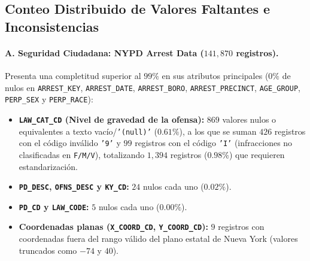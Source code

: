 \documentclass[11pt,a4paper]{article}
\begin{document}
\subsection{Conteo Distribuido de Valores Faltantes e Inconsistencias}
\label{subsec:conteo_faltantes}

\paragraph{A. Seguridad Ciudadana: NYPD Arrest Data ($141,870$ registros).}
Presenta una completitud superior al $99\%$ en sus atributos principales ($0\%$ de nulos en \texttt{ARREST\_KEY}, \texttt{ARREST\_DATE}, \texttt{ARREST\_BORO}, \texttt{ARREST\_PRECINCT}, \texttt{AGE\_GROUP}, \texttt{PERP\_SEX} y \texttt{PERP\_RACE}):
\begin{itemize}
    \item \textbf{\texttt{LAW\_CAT\_CD} (Nivel de gravedad de la ofensa):} $869$ valores nulos o equivalentes a texto vacío/\texttt{'(null)'} ($0.61\%$), a los que se suman $426$ registros con el código inválido \texttt{'9'} y $99$ registros con el código \texttt{'I'} (infracciones no clasificadas en \texttt{F/M/V}), totalizando $1,394$ registros ($0.98\%$) que requieren estandarización.
    \item \textbf{\texttt{PD\_DESC}, \texttt{OFNS\_DESC} y \texttt{KY\_CD}:} $24$ nulos cada uno ($0.02\%$).
    \item \textbf{\texttt{PD\_CD} y \texttt{LAW\_CODE}:} $5$ nulos cada uno ($0.00\%$).
    \item \textbf{Coordenadas planas (\texttt{X\_COORD\_CD}, \texttt{Y\_COORD\_CD}):} $9$ registros con coordenadas fuera del rango válido del plano estatal de Nueva York (valores truncados como $-74$ y $40$).
\end{itemize}
\end{document}
